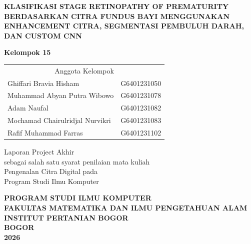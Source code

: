 
\clearpage
\thispagestyle{empty}
\begin{center}

\vspace*{1cm}

{\fontsize{14pt}{17pt}\selectfont\bfseries
KLASIFIKASI STAGE RETINOPATHY OF PREMATURITY\\
BERDASARKAN CITRA FUNDUS BAYI MENGGUNAKAN\\
ENHANCEMENT CITRA, SEGMENTASI PEMBULUH DARAH,\\
DAN CUSTOM CNN
}

\vspace{2.5cm}

{\fontsize{12pt}{14pt}\selectfont\bfseries
Kelompok 15
}

\vspace{0.5cm}

{\fontsize{12pt}{14pt}\selectfont
\begin{tabular}{ll}
\multicolumn{2}{c}{Anggota Kelompok}\\[0.3cm]
Ghiffari Bravia Hisham       & G6401231050 \\
Muhammad Abyan Putra Wibowo  & G6401231078 \\
Adam Naufal                  & G6401231082 \\
Mochamad Chairulridjal Nurvikri & G6401231083 \\
Rafif Muhammad Farras        & G6401231102 \\
\end{tabular}
}

\vspace{2cm}

{\fontsize{12pt}{14pt}\selectfont
Laporan Project Akhir\\
sebagai salah satu syarat penilaian mata kuliah\\
Pengenalan Citra Digital pada\\
Program Studi Ilmu Komputer
}

\vfill

{\fontsize{14pt}{17pt}\selectfont\bfseries
PROGRAM STUDI ILMU KOMPUTER\\
FAKULTAS MATEMATIKA DAN ILMU PENGETAHUAN ALAM\\
INSTITUT PERTANIAN BOGOR\\
BOGOR\\
2026
}

\end{center}
\clearpage